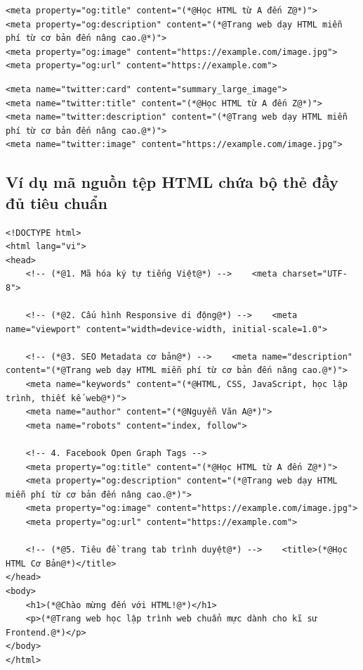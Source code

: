 \begin{codeWindow}
\begin{lstlisting}[language=HTML5]
<meta property="og:title" content="(*@Học HTML từ A đến Z@*)">
<meta property="og:description" content="(*@Trang web dạy HTML miễn phí từ cơ bản đến nâng cao.@*)">
<meta property="og:image" content="https://example.com/image.jpg">
<meta property="og:url" content="https://example.com">
\end{lstlisting}
\end{codeWindow}

\begin{codeWindow}
\begin{lstlisting}[language=HTML5]
<meta name="twitter:card" content="summary_large_image">
<meta name="twitter:title" content="(*@Học HTML từ A đến Z@*)">
<meta name="twitter:description" content="(*@Trang web dạy HTML miễn phí từ cơ bản đến nâng cao.@*)">
<meta name="twitter:image" content="https://example.com/image.jpg">
\end{lstlisting}
\end{codeWindow}

\subsection{Ví dụ mã nguồn tệp HTML chứa bộ thẻ  đầy đủ tiêu chuẩn}

\begin{codeWindow}
\begin{lstlisting}[language=HTML5]
<!DOCTYPE html>
<html lang="vi">
<head>
    <!-- (*@1. Mã hóa ký tự tiếng Việt@*) -->    <meta charset="UTF-8">
    
    <!-- (*@2. Cấu hình Responsive di động@*) -->    <meta name="viewport" content="width=device-width, initial-scale=1.0">
    
    <!-- (*@3. SEO Metadata cơ bản@*) -->    <meta name="description" content="(*@Trang web dạy HTML miễn phí từ cơ bản đến nâng cao.@*)">
    <meta name="keywords" content="(*@HTML, CSS, JavaScript, học lập trình, thiết kế web@*)">
    <meta name="author" content="(*@Nguyễn Văn A@*)">
    <meta name="robots" content="index, follow">
    
    <!-- 4. Facebook Open Graph Tags -->
    <meta property="og:title" content="(*@Học HTML từ A đến Z@*)">
    <meta property="og:description" content="(*@Trang web dạy HTML miễn phí từ cơ bản đến nâng cao.@*)">
    <meta property="og:image" content="https://example.com/image.jpg">
    <meta property="og:url" content="https://example.com">
    
    <!-- (*@5. Tiêu đề trang tab trình duyệt@*) -->    <title>(*@Học HTML Cơ Bản@*)</title>
</head>
<body>
    <h1>(*@Chào mừng đến với HTML!@*)</h1>
    <p>(*@Trang web học lập trình web chuẩn mực dành cho kĩ sư Frontend.@*)</p>
</body>
</html>
\end{lstlisting}
\end{codeWindow}


